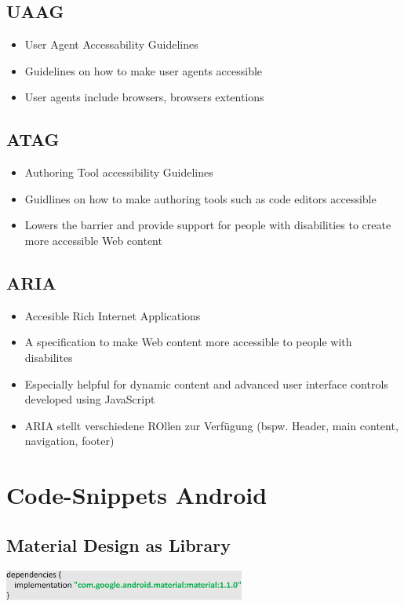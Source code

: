 \documentclass{report}
\newenvironment{Figure}
	{\par\medskip\noindent\minipage{\linewidth}}
	{\endminipage\par\medskip}
\theoremstyle{definition}
\theoremstyle{example}
\begin{document}
\section{UAAG}
\begin{itemize}
   \item User Agent Accessability Guidelines
   \item Guidelines on how to make user agents accessible
   \item User agents include browsers, browsers extentions
\end{itemize}

\section{ATAG}
\begin{itemize}
   \item Authoring Tool accessibility Guidelines
   \item Guidlines on how to make authoring tools such as code editors accessible
   \item Lowers the barrier and provide support for people with disabilities to create more accessible Web content
\end{itemize}

\section{ARIA}
\begin{itemize}
   \item Accesible Rich Internet Applications
   \item A specification to make Web content more accessible to people with disabilites
   \item Especially helpful for dynamic content and advanced user interface controls developed using JavaScript
   \item ARIA stellt verschiedene ROllen zur Verfügung (bspw. Header, main content, navigation, footer)
\end{itemize}


\chapter{Code-Snippets Android}

\section{Material Design as Library}
\begin{Figure}
   \centering
    \includegraphics[width=300px]{img/MDaL.png}
        \label{fig:Code Snippet Material Design Dependency}
\end{Figure}
\end{document}
